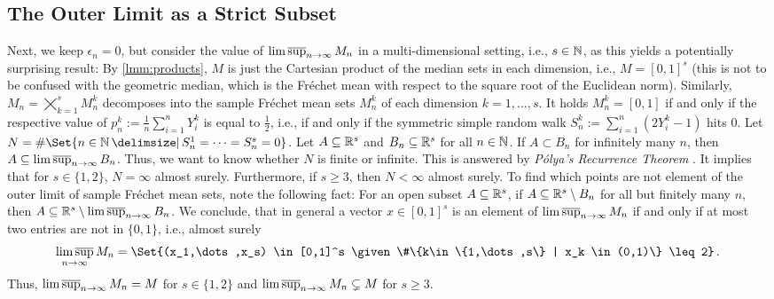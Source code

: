\subsection{The Outer Limit as a Strict Subset}
Next, we keep $\epsilon_n=0$, but consider the value of $\operatorname*{lim\, \overline{sup}}_{n\to\infty} M_n$ in a multi-dimensional setting, i.e., $s\in\mathbb{N}$, as this yields a potentially surprising result:
By \autoref{lmm:products}, $M$ is just the Cartesian product of the median sets in each dimension, i.e., $M = [0,1]^s$ (this is not to be confused with the geometric median, which is the Fréchet mean with respect to the square root of the Euclidean norm). Similarly, $M_n = \bigtimes_{k=1}^s M_n^k$ decomposes into the sample Fréchet mean sets $M_n^k$ of each dimension $k=1,\dots,s$. It holds $M_n^k = [0,1]$ if and only if the respective value of $p_n^k := \frac1n \sum_{i=1}^n Y_i^k$ is equal to $\frac12$, i.e., if and only if the symmetric simple random walk $S_n^k := \sum_{i=1}^n (2Y_i^k-1)$ hits $0$. Let $N = \#\Set{n\in\N\given S_n^1=\dots=S_n^s=0}$. Let $A\subseteq \mathbb{R}^s$ and $B_n\subseteq \mathbb{R}^s$ for all $n\in\mathbb{N}$. If $A\subset B_n$ for infinitely many $n$, then $A \subseteq \operatorname*{lim\, \overline{sup}}_{n\to\infty} B_n$. Thus, we want to know whether $N$ is finite or infinite. This is answered by \textit{Pólya's Recurrence Theorem} \cite{polya21}. It implies that for $s \in \{1, 2\}$, $N = \infty$ almost surely. Furthermore, if $s\geq 3$, then $N < \infty$ almost surely.
To find which points are not element of the outer limit of sample Fréchet mean sets, note the following fact: For an open subset $A\subseteq \mathbb{R}^s$, if $A \subseteq \mathbb{R}^s \setminus B_n$ for all but finitely many $n$, then $A \subseteq \mathbb{R}^s \setminus \operatorname*{lim\, \overline{sup}}_{n\to\infty} B_n$.
We conclude, that in general a vector $x \in [0,1]^s$ is an element of $\operatorname*{lim\, \overline{sup}}_{n\to\infty} M_n$ if and only if at most two entries are not in $\{0,1\}$, i.e., almost surely
\begin{equation*}
	\outerlim_{n\to\infty} M_n = \Set{(x_1,\dots,x_s) \in [0,1]^s \given \#\{k\in\{1,\dots,s\} | x_k \in (0,1)\} \leq 2}
	\eqfs
\end{equation*}
Thus, $\operatorname*{lim\, \overline{sup}}_{n\to\infty} M_n = M$ for $s\in\{1,2\}$ and $\operatorname*{lim\, \overline{sup}}_{n\to\infty} M_n \subsetneq M$ for $s \geq 3$.

